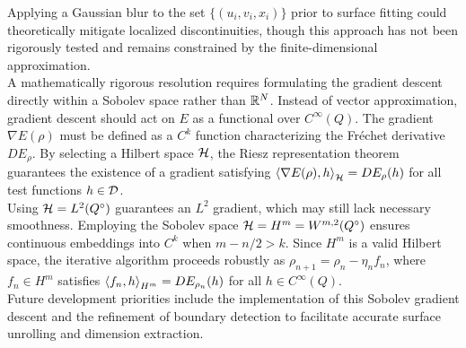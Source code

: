 \documentclass{article}
\newcommand{\grad}{\nabla}
\begin{document}
Applying a Gaussian blur to the set $\{(u_i, v_i, x_i)\}$ prior to surface fitting could theoretically mitigate localized discontinuities, though this approach has not been rigorously tested and remains constrained by the finite-dimensional approximation. \\

A mathematically rigorous resolution requires formulating the gradient descent directly within a Sobolev space rather than $\R^N$. Instead of vector approximation, gradient descent should act on $E$ as a functional over $C^\infty(Q)$. The gradient $\grad E(\rho)$ must be defined as a $C^k$ function characterizing the Fr\'echet derivative $DE_\rho$. By selecting a Hilbert space $\cal H$, the Riesz representation theorem guarantees the existence of a gradient satisfying $\gen{\grad E(\rho), h}_{\cal H} = DE_\rho (h)$ for all test functions $h \in \cal D$. \\

Using $\cal H = L^2(Q^\circ)$ guarantees an $L^2$ gradient, which may still lack necessary smoothness. Employing the Sobolev space $\cal H = H^m = W^{m, 2}(Q^\circ)$ ensures continuous embeddings into $C^k$ when $m - n/2 > k$. Since $H^m$ is a valid Hilbert space, the iterative algorithm proceeds robustly as $\rho_{n+1} = \rho_n - \eta_n f_n$, where $f_n \in H^m$ satisfies $\gen{f_n, h}_{H^m} = DE_{\rho_n}(h)$ for all $h \in C^\infty(Q)$. \\

Future development priorities include the implementation of this Sobolev gradient descent and the refinement of boundary detection to facilitate accurate surface unrolling and dimension extraction.
\end{document}
